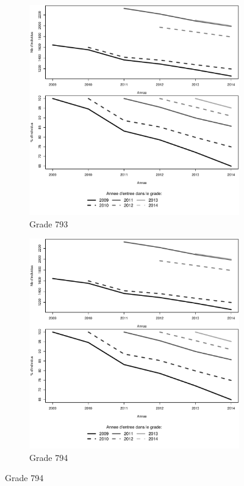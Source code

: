 \documentclass[11pt,a4paper]{article}
\begin{document}
\begin{figure}[ht] 
  \caption{Survie dans le grade: Adjoints techniques}
  \label{surv_by_entry} 
  \begin{subfigure}[b]{0.5\linewidth}
      \caption{Grade 793} 
    \label{echelon_by_neg_0} 
    \centering
    \includegraphics[width=1\linewidth]{AT_survival_793.pdf} 
  \end{subfigure}%
  \begin{subfigure}[b]{0.5\linewidth}
        \caption{Grade 794} 
    \label{echelon_by_neg_1} 
    \centering
    \includegraphics[width=1\linewidth]{AT_survival_794.pdf} 

\end{subfigure}
\end{figure}
\end{document}
